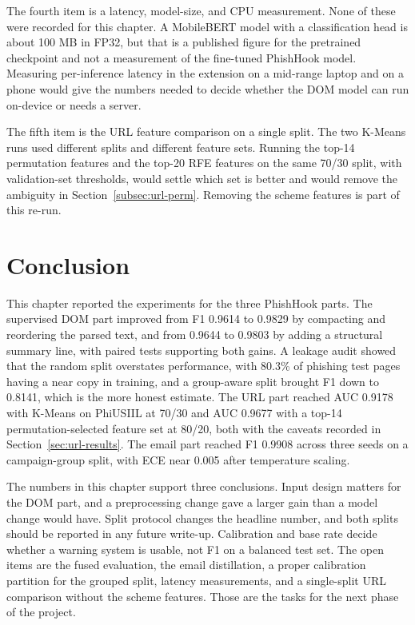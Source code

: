 \documentclass{FastFyp}
\begin{document}
The fourth item is a latency, model-size, and CPU measurement. None of these were recorded for this chapter. A MobileBERT model with a classification head is about 100 MB in FP32, but that is a published figure for the pretrained checkpoint and not a measurement of the fine-tuned PhishHook model. Measuring per-inference latency in the extension on a mid-range laptop and on a phone would give the numbers needed to decide whether the DOM model can run on-device or needs a server.

The fifth item is the URL feature comparison on a single split. The two K-Means runs used different splits and different feature sets. Running the top-14 permutation features and the top-20 RFE features on the same 70/30 split, with validation-set thresholds, would settle which set is better and would remove the ambiguity in Section~\ref{subsec:url-perm}. Removing the scheme features is part of this re-run.

\section{Conclusion}
\label{sec:ch9-conclusion}

This chapter reported the experiments for the three PhishHook parts. The supervised DOM part improved from F1 0.9614 to 0.9829 by compacting and reordering the parsed text, and from 0.9644 to 0.9803 by adding a structural summary line, with paired tests supporting both gains. A leakage audit showed that the random split overstates performance, with 80.3\% of phishing test pages having a near copy in training, and a group-aware split brought F1 down to 0.8141, which is the more honest estimate. The URL part reached AUC 0.9178 with K-Means on PhiUSIIL at 70/30 and AUC 0.9677 with a top-14 permutation-selected feature set at 80/20, both with the caveats recorded in Section~\ref{sec:url-results}. The email part reached F1 0.9908 across three seeds on a campaign-group split, with ECE near 0.005 after temperature scaling.

The numbers in this chapter support three conclusions. Input design matters for the DOM part, and a preprocessing change gave a larger gain than a model change would have. Split protocol changes the headline number, and both splits should be reported in any future write-up. Calibration and base rate decide whether a warning system is usable, not F1 on a balanced test set. The open items are the fused evaluation, the email distillation, a proper calibration partition for the grouped split, latency measurements, and a single-split URL comparison without the scheme features. Those are the tasks for the next phase of the project.
\end{document}
